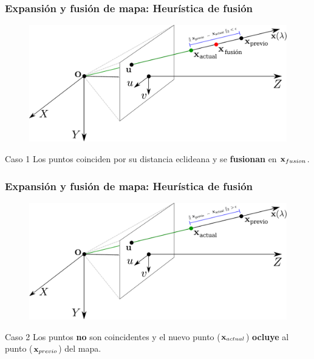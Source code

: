 \documentclass[compress]{beamer}
\begin{document}
\begin{frame}
	\frametitle{Expansión y fusión de mapa: Heurística de fusión}
	\begin{figure}[htb]
		\centering
		\includegraphics[width=\columnwidth]{./method/metodo-fusion-spa.pdf}
	\end{figure}
	\begin{block}{Caso 1}
		Los puntos coinciden por su distancia eclideana y se \textbf{fusionan} en $\boldsymbol{\mathbf{x}}_{fusion}$.
	\end{block}
\end{frame}


\begin{frame}
	\frametitle{Expansión y fusión de mapa: Heurística de fusión}
	\begin{figure}[htb]
		\centering
		\includegraphics[width=\columnwidth]{./method/metodo-fusion-spa-caso-1.pdf}
	\end{figure}
	\begin{block}{Caso 2}
		Los puntos \textbf{no} son coincidentes y el nuevo punto ($\boldsymbol{\mathbf{x}}_{actual}$) \textbf{ocluye} al punto ($\boldsymbol{\mathbf{x}}_{previo}$) del mapa.
	\end{block}
\end{frame}
\end{document}

